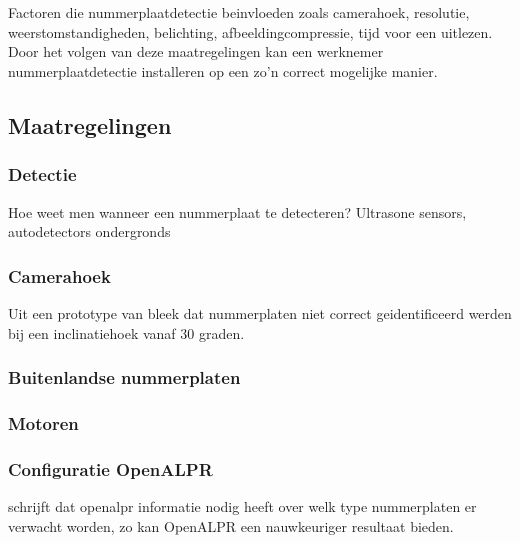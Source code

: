 
\chapter{}
\label{ch:maatregelingenraspberrypi}

Factoren die nummerplaatdetectie beinvloeden zoals camerahoek, resolutie, weerstomstandigheden, belichting, afbeeldingcompressie, tijd voor een uitlezen. Door het volgen van deze maatregelingen kan een werknemer nummerplaatdetectie installeren op een zo'n correct mogelijke manier.

\section{Maatregelingen}

\subsection{Detectie}
Hoe weet men wanneer een nummerplaat te detecteren?
Ultrasone sensors, autodetectors ondergronds

\subsection{Camerahoek}
Uit een prototype van \textcite{arrieta2019prototype} bleek dat nummerplaten niet correct geidentificeerd werden bij een inclinatiehoek vanaf 30 graden. 

\subsection{Buitenlandse nummerplaten}

\subsection{Motoren}

\subsection{Configuratie OpenALPR}
\textcite{arrietta2019prototype} schrijft dat openalpr informatie nodig heeft over welk type nummerplaten er verwacht worden, zo kan OpenALPR een nauwkeuriger resultaat bieden.